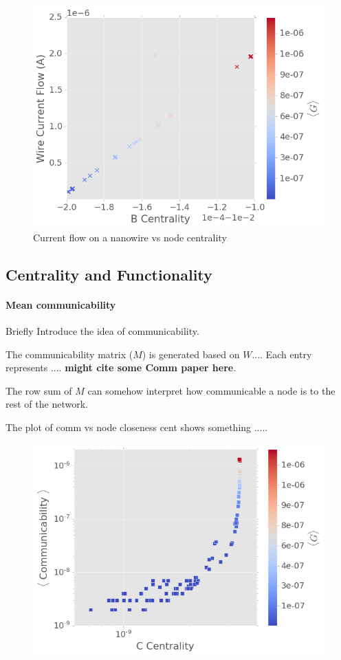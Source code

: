 \documentclass[%
 reprint,
 amsmath,amssymb,
 aps,
]{revtex4-2}
\begin{document}
\begin{figure}[h]
	\centering
	\includegraphics[width=1\linewidth]{figure/I_cent}
	\caption{Current flow on a nanowire vs node centrality}
	\label{fig:i_cent}
\end{figure}

\newpage
\subsection{\label{sec:level2} Centrality and Functionality}

\paragraph{Mean communicability}
Briefly Introduce the idea of communicability. 

The communicability matrix ($M$) is generated based on $W$.... Each entry represents .... \textbf{might cite some Comm paper here}.

The row sum of $M$ can somehow interpret how communicable a node is to the rest of the network.

The plot of comm vs node closeness cent shows something .....

\begin{figure}[h]
	\centering
	\includegraphics[width=1\linewidth]{figure/comm_cent}
	\caption{}
	\label{fig:comm_cent}
\end{figure}
\end{document}
